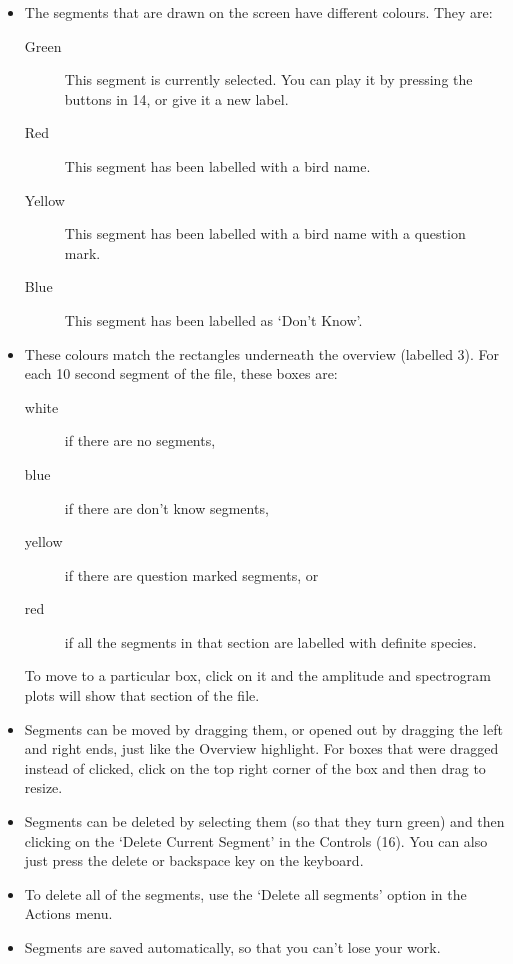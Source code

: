 \documentclass{article}
\begin{document}
\begin{itemize}
\item The segments that are drawn on the screen have different colours. They are:
	\begin{description} 
	\item[Green] This segment is currently selected. You can play it by pressing the buttons in 14, or give it a new label. 
	\item[Red] This segment has been labelled with a bird name.
	\item[Yellow] This segment has been labelled with a bird name with a question mark.
	\item[Blue] This segment has been labelled as `Don't Know'.
	\end{description}

\item These colours match the rectangles underneath the overview (labelled 3). For each 10 second segment of the file, these boxes are:

	\begin{description} 
 	\item[white] if there are no segments, 
	\item[blue] if there are don't know segments, 
	\item[yellow] if there are question marked segments, or 
	\item[red] if all the segments in that section are labelled with definite species. 
	\end{description}
To move to a particular box, click on it and the amplitude and spectrogram plots will show that section of the file.  

\item Segments can be moved by dragging them, or opened out by dragging the left and right ends, just like the Overview highlight. For boxes that were dragged instead of clicked, click on the top right corner of the box and then drag to resize.

\item Segments can be deleted by selecting them (so that they turn green) and then clicking on the `Delete Current Segment' in the Controls (16). You can also just press the delete or backspace key on the keyboard. 

\item To delete all of the segments, use the `Delete all segments' option in the Actions menu. 

\item Segments are saved automatically, so that you can't lose your work.

\end{itemize}
\end{document}
